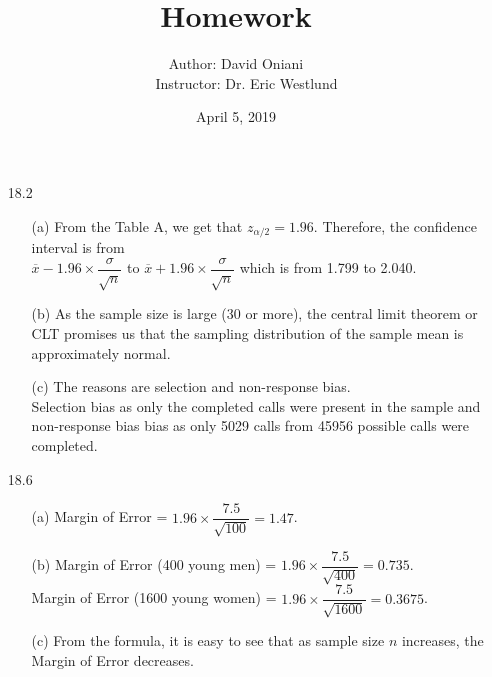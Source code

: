 \documentclass[11pt, a4paper]{article}
\title{\bf{Homework \textnumero 13}}
\author{Author: David Oniani
\\
\ \ \ Instructor: Dr. Eric Westlund}
\date{April 5, 2019}
\begin{document}
\maketitle
\begin{itemize}
\item[18.2]
\begin{itemize}
\item[(a)]
From the Table A, we get that $z_{\alpha/2} = 1.96$.
Therefore, the confidence interval is from
\vspace{0.05cm}\\
$\overline{x} - 1.96 \times \dfrac{\sigma}{\sqrt{n}}$
to $\overline{x} + 1.96 \times \dfrac{\sigma}{\sqrt{n}}$ which is from 1.799 to 2.040.

\item[]

\item[(b)]
As the sample size is large (30 or more), the central limit theorem or CLT promises us
that the sampling distribution of the sample mean is approximately normal.

\item[]

\item[(c)]
The reasons are selection and non-response bias.\\
Selection bias as only the completed calls were present in the sample
and non-response bias bias as only 5029 calls from 45956 possible calls
were completed.
\end{itemize}

\item[]
\item[]

\item[18.6]
\begin{itemize}
\item[(a)]
Margin of Error = $1.96 \times \dfrac{7.5}{\sqrt{100}} = 1.47$.

\item[]

\item[(b)]
Margin of Error (400 young men) = $1.96 \times \dfrac{7.5}{\sqrt{400}} = 0.735$.
\vspace{0.05cm}\\
Margin of Error (1600 young women) = $1.96 \times \dfrac{7.5}{\sqrt{1600}} = 0.3675$.

\item[]

\item[(c)]
From the formula, it is easy to see that as sample size $n$ increases,
the Margin of Error decreases.
\end{itemize}


\end{itemize}
\end{document}
